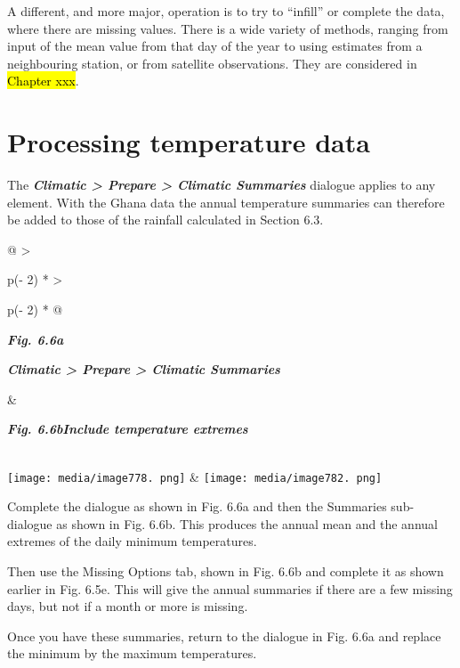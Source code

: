 \documentclass[
  letterpaper,
  DIV=11,
  numbers=noendperiod]{scrreprt}
\begin{document}
A different, and more major, operation is to try to ``infill'' or
complete the data, where there are missing values. There is a wide
variety of methods, ranging from input of the mean value from that day
of the year to using estimates from a neighbouring station, or from
satellite observations. They are considered in \hl{Chapter xxx}.

\section{Processing temperature data}\label{processing-temperature-data}

The \textbf{\emph{Climatic \textgreater{} Prepare \textgreater{}
Climatic Summaries}} dialogue applies to any element. With the Ghana
data the annual temperature summaries can therefore be added to those of
the rainfall calculated in Section 6.3.

\begin{longtable}[]{@{}
  >{\raggedright\arraybackslash}p{(\columnwidth - 2\tabcolsep) * }
  >{\raggedright\arraybackslash}p{(\columnwidth - 2\tabcolsep) * }@{}}
\toprule\noalign{}
\begin{minipage}[b]{\linewidth}\raggedright
\textbf{\emph{Fig. 6.6a}}

\textbf{\emph{Climatic \textgreater{} Prepare \textgreater{} Climatic
Summaries}}
\end{minipage} & \begin{minipage}[b]{\linewidth}\raggedright
\textbf{\emph{Fig. 6.6bInclude temperature extremes}}
\end{minipage} \\
\midrule\noalign{}
\endhead
\bottomrule\noalign{}
\endlastfoot
\texttt{[image: media/image778. png]}
&
\texttt{[image: media/image782. png]} \\
\end{longtable}

Complete the dialogue as shown in Fig. 6.6a and then the Summaries
sub-dialogue as shown in Fig. 6.6b. This produces the annual mean and
the annual extremes of the daily minimum temperatures.

Then use the Missing Options tab, shown in Fig. 6.6b and complete it as
shown earlier in Fig. 6.5e. This will give the annual summaries if there
are a few missing days, but not if a month or more is missing.

Once you have these summaries, return to the dialogue in Fig. 6.6a and
replace the minimum by the maximum temperatures.
\end{document}
